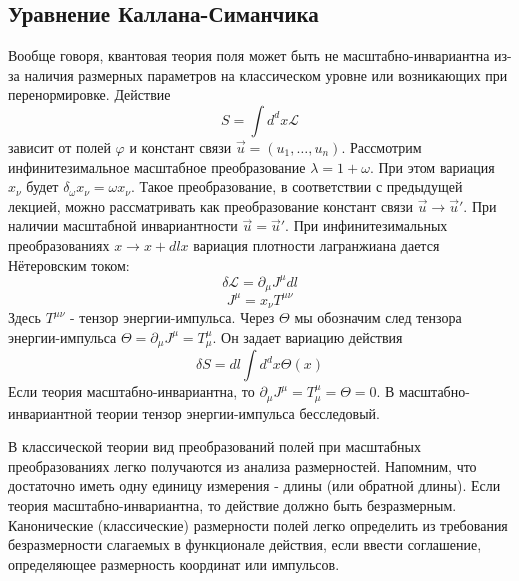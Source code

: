 \documentclass[a4paper,12pt]{article}
\theoremstyle{definition}
\theoremstyle{definition}
\theoremstyle{definition}
\begin{document}
\subsection{Уравнение Каллана-Симанчика}

Вообще говоря, квантовая теория поля может быть не масштабно-инвариантна из-за наличия размерных параметров на классическом уровне или возникающих при перенормировке. Действие
\begin{equation}
  \label{eq:73}
  S=\int d^dx \mathcal{L}
\end{equation}
зависит от полей $\varphi$ и констант связи $\vec u=(u_1,\dots,u_n)$. Рассмотрим инфинитезимальное масштабное преобразование $\lambda=1+\omega$. При этом вариация $x_{\nu}$ будет $\delta_{\omega}x_{\nu}=\omega x_{\nu}$. Такое преобразование, в соответствии с предыдущей лекцией,  можно рассматривать как преобразование констант связи $\vec u\to \vec u'$. При наличии масштабной инвариантности $\vec u = \vec u'$. При инфинитезимальных преобразованиях $x\to x+dl x$ вариация плотности лагранжиана дается Нётеровским током:
\begin{equation}
  \label{eq:74}
  \delta\mathcal{L}=\partial_{\mu}J^{\mu}dl
\end{equation}
\begin{equation}
  \label{eq:75}
  J^{\mu}=x_{\nu}T^{\mu\nu}
\end{equation}
Здесь $T^{\mu\nu}$ - тензор энергии-импульса.  Через $\Theta$ мы обозначим след тензора энергии-импульса $\Theta=\partial_{\mu}J^{\mu}=T_{\mu}^{\mu}$. Он задает вариацию действия
\begin{equation}
  \label{eq:87}
  \delta S=dl \int d^d x \Theta(x)
\end{equation}
Если теория масштабно-инвариантна, то $\partial_{\mu}J^{\mu}=T_{\mu}^{\mu}=\Theta=0$. В масштабно-инвариантной теории тензор энергии-импульса бесследовый.

В классической теории вид преобразований полей при масштабных преобразованиях легко получаются из анализа размерностей. Напомним, что достаточно иметь одну единицу измерения - длины (или обратной длины). Если теория масштабно-инвариантна, то действие должно быть безразмерным. Канонические (классические) размерности полей легко определить из требования безразмерности слагаемых в функционале действия, если ввести соглашение, определяющее размерность координат или импульсов.
\end{document}
